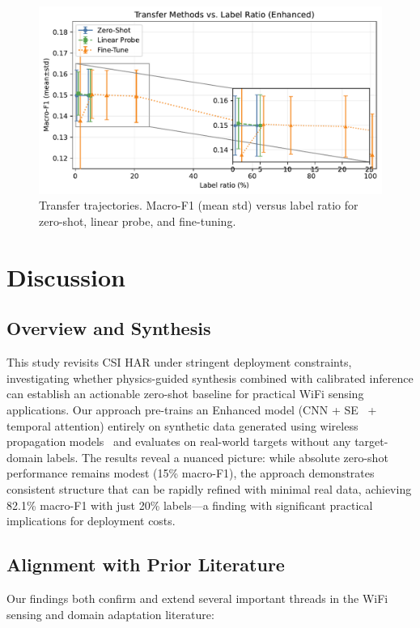 \documentclass[journal]{IEEEtran}
\begin{document}
\begin{figure}[t]
\centering
\includegraphics[width=\columnwidth]{plots/transfer_compare.pdf}
\caption{Transfer trajectories. Macro-F1 (mean\,\textpm\,std) versus label ratio for zero-shot, linear probe, and fine-tuning.}
\label{fig:transfer_compare}
\end{figure}

\section{Discussion}

\subsection{Overview and Synthesis}
This study revisits CSI HAR under stringent deployment constraints, investigating whether physics-guided synthesis combined with calibrated inference can establish an actionable zero-shot baseline for practical WiFi sensing applications. Our approach pre-trains an Enhanced model (CNN + SE~\cite{se_networks2018} + temporal attention) entirely on synthetic data generated using wireless propagation models~\cite{saleh1987statistical,goldsmith2005wireless} and evaluates on real-world targets without any target-domain labels. The results reveal a nuanced picture: while absolute zero-shot performance remains modest (15\% macro-F1), the approach demonstrates consistent structure that can be rapidly refined with minimal real data, achieving 82.1\% macro-F1 with just 20\% labels—a finding with significant practical implications for deployment costs.

\subsection{Alignment with Prior Literature}
Our findings both confirm and extend several important threads in the WiFi sensing and domain adaptation literature:
\end{document}
